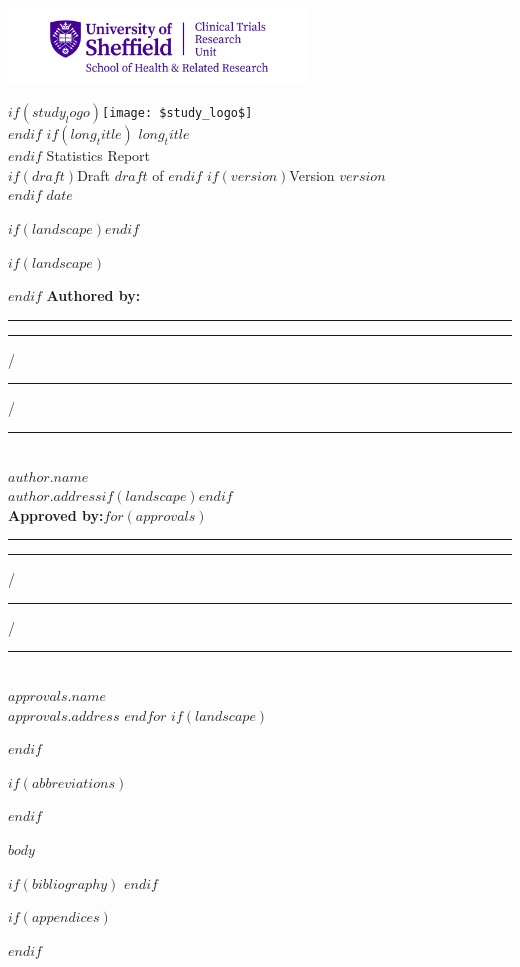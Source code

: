 \documentclass[11pt,a4paper,british,
$for(classoption)$
  $classoption$ $sep$,
$endfor$$if(landscape)$ landscape $endif$]{article}
\begin{document}
\thispagestyle{empty}

\includegraphics[height=2cm]{Images/CTRULogo}
\begin{center}
$if(study_logo) $\texttt{[image: \$study\_logo\$]}\\ $endif$
$if(long_title)$ $long_title$\\[5mm] $endif$
{\Huge Statistics Report}\\
$if(draft)${\Large Draft $draft$ of }$endif$ $if(version)${\Large Version $version$}\\$endif$
{\Large $date$}
\end{center}
$if(landscape)$\vspace{-1cm}$endif$

\begin{singlespace}
$if(landscape)$\begin{multicols}{2}$endif$
\textbf{Authored by:}\\[1cm]
\rule{5cm}{1pt}\hspace{1cm}\rule{1cm}{1pt} /\rule{1cm}{1pt} /\rule{2cm}{1pt}\\
\textit{$author.name$\\
$author.address$}$if(landscape)$\newcolumn$endif$\\
\textbf{Approved by:}$for(approvals)$\\[1cm]
\rule{5cm}{1pt}\hspace{1cm}\rule{1cm}{1pt} /\rule{1cm}{1pt} /\rule{2cm}{1pt}\\
\textit{$approvals.name$\\
$approvals.address$}
$endfor$
$if(landscape)$\end{multicols}$endif$
\end{singlespace}

\clearpage
{}
\tableofcontents
\listoftables
\listoffigures

$if(abbreviations)$

$endif$

\clearpage
{}

$body$

$if(bibliography)$
\printbibliography[heading=bibintoc]
$endif$

$if(appendices)$
\begin{appendices}



\end{appendices}
$endif$
\end{document}
